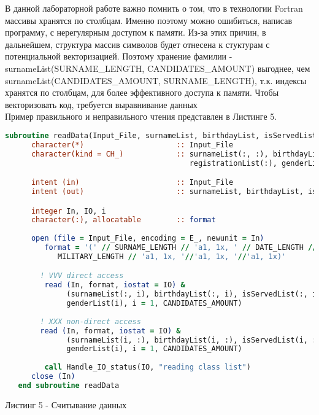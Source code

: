 \documentclass[12pt, a4paper]{report}
\begin{document}
В данной лабораторной работе важно помнить о том, что в технологии Fortran массивы хранятся по столбцам. Именно поэтому можно ошибиться, написав программу, с нерегулярным доступом к памяти. Из-за этих причин, в дальнейшем, структура массив символов будет отнесена к стуктурам с потенциальной векторизацией. Поэтому хранение фамилии - surnameList(SURNAME\_LENGTH, CANDIDATES\_AMOUNT) выгоднее, чем surnameList(CANDIDATES\_AMOUNT, SURNAME\_LENGTH), т.к. индексы хранятся по столбцам, для более эффективного доступа к памяти. Чтобы векторизовать код, требуется выравнивание данных \\
Пример правильного и неправильного чтения представлен в Листинге 5. 
 
\begin{lstlisting}[language=Fortran]
  subroutine readData(Input_File, surnameList, birthdayList, isServedList, registrationList, genderList)
      character(*)                     :: Input_File
      character(kind = CH_)            :: surnameList(:, :), birthdayList(:, :), isServedList(:, :), &
                                          registrationList(:), genderList(:)

      intent (in)                      :: Input_File
      intent (out)                     :: surnameList, birthdayList, isServedList, registrationList, genderList

      integer In, IO, i
      character(:), allocatable        :: format
      
      open (file = Input_File, encoding = E_, newunit = In)
         format = '(' // SURNAME_LENGTH // 'a1, 1x, ' // DATE_LENGTH // 'a1, 1x, ' // &
            MILITARY_LENGTH // 'a1, 1x, '//'a1, 1x, '//'a1, 1x)'

        ! VVV direct access
         read (In, format, iostat = IO) &
              (surnameList(:, i), birthdayList(:, i), isServedList(:, i), registrationList(i), &
              genderList(i), i = 1, CANDIDATES_AMOUNT)
              
        ! XXX non-direct access
        read (In, format, iostat = IO) &
              (surnameList(i, :), birthdayList(i, :), isServedList(i, :), registrationList(i), &
              genderList(i), i = 1, CANDIDATES_AMOUNT)
         
         call Handle_IO_status(IO, "reading class list")
      close (In)
   end subroutine readData
\end{lstlisting}
\begin{center}
Листинг 5 - Считывание данных
\end{center}
\end{document}

